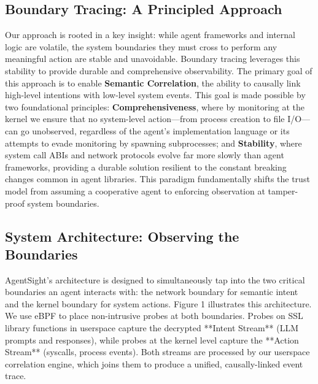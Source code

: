 \subsection{Boundary Tracing: A Principled Approach}
Our approach is rooted in a key insight: while agent frameworks and internal logic are volatile, the system boundaries they must cross to perform any meaningful action are stable and unavoidable. Boundary tracing leverages this stability to provide durable and comprehensive observability. The primary goal of this approach is to enable \textbf{Semantic Correlation}, the ability to causally link high-level intentions with low-level system events. This goal is made possible by two foundational principles: \textbf{Comprehensiveness}, where by monitoring at the kernel we ensure that no system-level action—from process creation to file I/O—can go unobserved, regardless of the agent's implementation language or its attempts to evade monitoring by spawning subprocesses; and \textbf{Stability}, where system call ABIs and network protocols evolve far more slowly than agent frameworks, providing a durable solution resilient to the constant breaking changes common in agent libraries. This paradigm fundamentally shifts the trust model from assuming a cooperative agent to enforcing observation at tamper-proof system boundaries.

\subsection{System Architecture: Observing the Boundaries}
AgentSight's architecture is designed to simultaneously tap into the two critical boundaries an agent interacts with: the network boundary for semantic intent and the kernel boundary for system actions. Figure 1 illustrates this architecture. We use eBPF to place non-intrusive probes at both boundaries. Probes on SSL library functions in userspace capture the decrypted **Intent Stream** (LLM prompts and responses), while probes at the kernel level capture the **Action Stream** (syscalls, process events). Both streams are processed by our userspace correlation engine, which joins them to produce a unified, causally-linked event trace.

